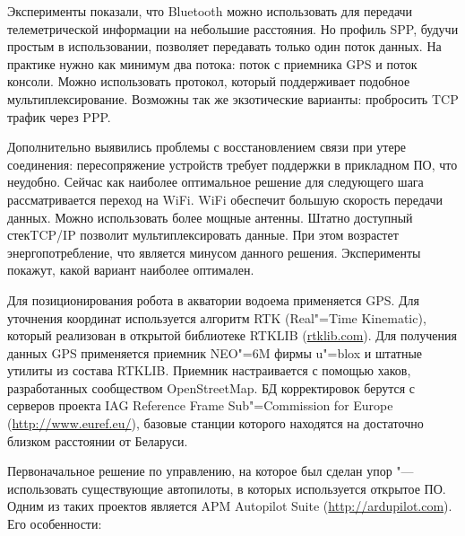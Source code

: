 \documentclass[10pt, a5paper]{article}
\begin{document}
Эксперименты показали, что Bluetooth можно использовать для передачи телеметрической информации на небольшие расстояния. Но профиль SPP, будучи простым в использовании, позволяет передавать только один поток данных. На практике нужно как минимум два потока: поток с приемника GPS и поток консоли. Можно использовать протокол, который поддерживает подобное мультиплексирование. Возможны так же экзотические варианты: пробросить TCP трафик через PPP.

Дополнительно выявились проблемы с восстановлением связи при утере соединения: пересопряжение устройств требует поддержки в прикладном ПО, что неудобно. Сейчас как наиболее оптимальное решение для следующего шага рассматривается переход на WiFi.
WiFi обеспечит большую скорость передачи данных. Можно использовать более мощные антенны. Штатно доступный стек\linebreak TCP/IP позволит мультиплексировать данные. При этом возрастет энергопотребление, что является минусом данного решения. Эксперименты покажут, какой вариант наиболее оптимален.

Для позиционирования робота в акватории водоема применяется GPS. Для уточнения координат используется алгоритм RTK (Real"=Time Kinematic), который реализован в открытой библиотеке RTKLIB (\url{rtklib.com}). Для получения данных GPS применяется приемник NEO"=6M фирмы u"=blox и штатные утилиты из состава RTKLIB. Приемник настраивается с помощью хаков, разработанных сообществом OpenStreetMap. БД корректировок берутся с серверов проекта IAG Reference Frame Sub"=Commission for Europe (\url{http://www.euref.eu/}), базовые станции которого находятся на достаточно близком расстоянии от Беларуси.

Первоначальное решение по управлению, на которое был сделан упор "--- использовать существующие автопилоты, в которых используется открытое ПО. Одним из таких проектов является APM Autopilot Suite (\url{http://ardupilot.com}). Его особенности:
\end{document}
